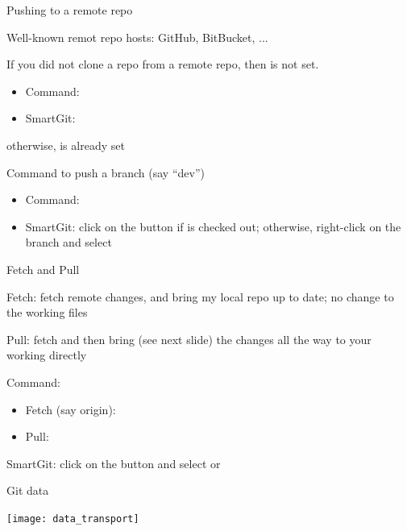 \documentclass[hyperref,compress,handout,9pt,usepdftitle=false]{beamer}
\begin{document}
\begin{frame}{Pushing to a remote repo}
\begin{witemize}
\item Well-known remot repo hosts: GitHub, BitBucket, ...
\item If you did not clone a repo from a remote repo, then  is not set.
\begin{itemize}
  \item Command: 
  \item SmartGit: 
\end{itemize}
otherwise,  is already set
\item Command to push a branch (say ``dev'')
\begin{itemize}
  \item Command: 
  \item SmartGit: click on the  button if  is checked out; otherwise, right-click on the  branch and select 
\end{itemize}
\end{witemize}
\end{frame}

\begin{frame}{Fetch and Pull}
\begin{witemize}
\item Fetch: fetch remote changes, and bring my local repo up to date; no change to the working files
\item Pull: fetch and then bring (see next slide) the changes all the way to your working directly
\item Command:
\begin{itemize}
  \item Fetch (say origin): 
  \item Pull: 
\end{itemize}
\item SmartGit: click on the  button and select  or 
\end{witemize}
\end{frame}

\begin{frame}{Git data}
\begin{center}
  \texttt{[image: data\_transport]}
\end{center}
\end{frame}
\end{document}

